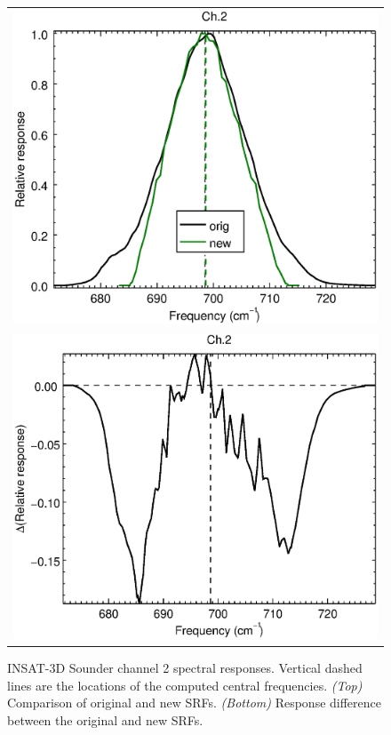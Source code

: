 \begin{figure}[H]
  \centering
  \begin{tabular}{c}
    \includegraphics[scale=0.55]{graphics/sndr/srf/sndr_insat3d-2.eps} \\
    \includegraphics[scale=0.55]{graphics/sndr/srf/sndr_insat3d-2.difference.eps}
  \end{tabular}
  \caption{INSAT-3D Sounder channel 2 spectral responses. Vertical dashed lines are the locations of the computed central frequencies. \emph{(Top)} Comparison of original and new SRFs. \emph{(Bottom)} Response difference between the original and new SRFs.}
  \label{fig:sndr_ch2}
\end{figure}


